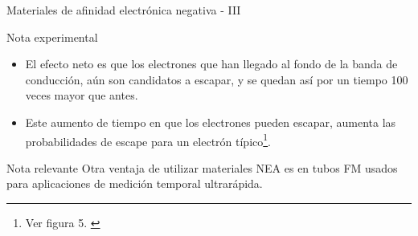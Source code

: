 \documentclass[a4paper,10pt]{beamer}
\begin{document}
\begin{frame}{Materiales de afinidad electrónica negativa - III}
 
 \begin{exampleblock}{Nota experimental}
  \begin{itemize}
  \item \begin{justify}
	El efecto neto es que los electrones que han llegado al fondo de la banda 
	de conducción, aún son candidatos a escapar, y se quedan así por un tiempo 100
	veces mayor que antes.
	\end{justify}
 \item \begin{justify}
        Este aumento de tiempo en que los electrones pueden escapar, aumenta 
        las probabilidades de escape para un electrón típico\footnote{Ver figura
        5. \hyperlink{milink1}{}}.
       \end{justify}
  \end{itemize}
 \end{exampleblock}
 
 \begin{block}{Nota relevante}
  Otra ventaja de utilizar materiales NEA es en tubos FM usados para 
  aplicaciones de medición temporal ultrarápida.
 \end{block}
\end{frame}
\end{document}

